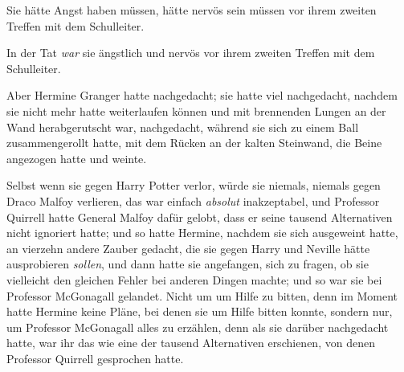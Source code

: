 Sie hätte Angst haben müssen, hätte nervös sein müssen vor ihrem zweiten Treffen mit dem Schulleiter.

In der Tat \emph{war} sie ängstlich und nervös vor ihrem zweiten Treffen mit dem Schulleiter.

Aber Hermine Granger hatte nachgedacht; sie hatte viel nachgedacht, nachdem sie nicht mehr hatte weiterlaufen können und mit brennenden Lungen an der Wand herabgerutscht war, nachgedacht, während sie sich zu einem Ball zusammengerollt hatte, mit dem Rücken an der kalten Steinwand, die Beine angezogen hatte und weinte.

Selbst wenn sie gegen Harry Potter verlor, würde sie niemals, niemals gegen Draco Malfoy verlieren, das war einfach \emph{absolut} inakzeptabel, und Professor Quirrell hatte General Malfoy dafür gelobt, dass er seine tausend Alternativen nicht ignoriert hatte; und so hatte Hermine, nachdem sie sich ausgeweint hatte, an vierzehn andere Zauber gedacht, die sie gegen Harry und Neville hätte ausprobieren \emph{sollen}, und dann hatte sie angefangen, sich zu fragen, ob sie vielleicht den gleichen Fehler bei anderen Dingen machte; und so war sie bei Professor McGonagall gelandet. Nicht um um Hilfe zu bitten, denn im Moment hatte Hermine keine Pläne, bei denen sie um Hilfe bitten konnte, sondern nur, um Professor McGonagall alles zu erzählen, denn als sie darüber nachgedacht hatte, war ihr das wie eine der tausend Alternativen erschienen, von denen Professor Quirrell gesprochen hatte.

